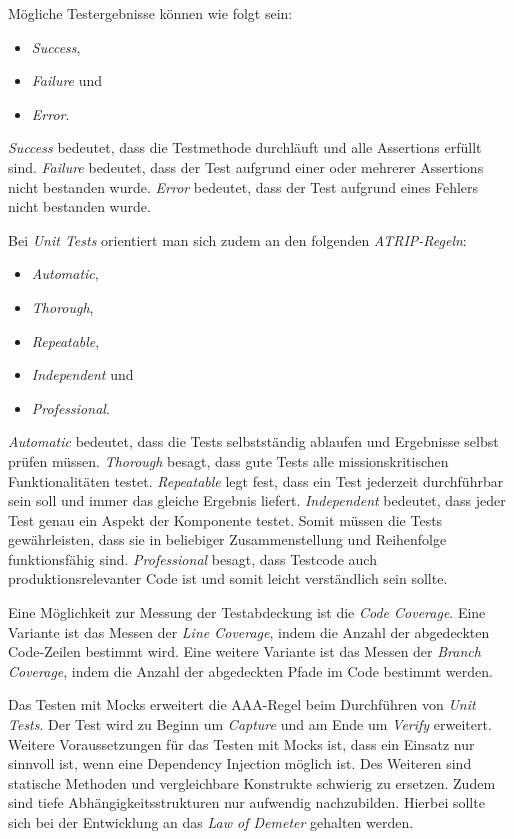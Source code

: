 Mögliche Testergebnisse können wie folgt sein:
\begin{itemize}
    \item \textit{Success},
    \item \textit{Failure} und
    \item \textit{Error}.
\end{itemize}

\textit{Success} bedeutet, dass die Testmethode durchläuft und alle Assertions erfüllt sind.
\textit{Failure} bedeutet, dass der Test aufgrund einer oder mehrerer Assertions nicht bestanden wurde.
\textit{Error} bedeutet, dass der Test aufgrund eines Fehlers nicht bestanden wurde.

Bei \textit{Unit Tests} orientiert man sich zudem an den folgenden \textit{ATRIP-Regeln}:
\begin{itemize}
    \item \textit{Automatic},
    \item \textit{Thorough},
    \item \textit{Repeatable},
    \item \textit{Independent} und
    \item \textit{Professional}.
\end{itemize}

\textit{Automatic} bedeutet, dass die Tests selbstständig ablaufen und Ergebnisse selbst prüfen müssen.
\textit{Thorough} besagt, dass gute Tests alle missionskritischen Funktionalitäten testet.
\textit{Repeatable} legt fest, dass ein Test jederzeit durchführbar sein soll und immer das gleiche Ergebnis liefert.
\textit{Independent} bedeutet, dass jeder Test genau ein Aspekt der Komponente testet.
Somit müssen die Tests gewährleisten, dass sie in beliebiger Zusammenstellung und Reihenfolge funktionsfähig sind.
\textit{Professional} besagt, dass Testcode auch produktionsrelevanter Code ist und somit leicht verständlich sein sollte.

Eine Möglichkeit zur Messung der Testabdeckung ist die \textit{Code Coverage}.
Eine Variante ist das Messen der \textit{Line Coverage}, indem die Anzahl der abgedeckten Code-Zeilen bestimmt wird.
Eine weitere Variante ist das Messen der \textit{Branch Coverage}, indem die Anzahl der abgedeckten Pfade im Code bestimmt werden.

Das Testen mit Mocks erweitert die AAA-Regel beim Durchführen von \textit{Unit Tests}.
Der Test wird zu Beginn um \textit{Capture} und am Ende um \textit{Verify} erweitert.
Weitere Voraussetzungen für das Testen mit Mocks ist, dass ein Einsatz nur sinnvoll ist, wenn eine Dependency Injection möglich ist.
Des Weiteren sind statische Methoden und vergleichbare Konstrukte schwierig zu ersetzen.
Zudem sind tiefe Abhängigkeitsstrukturen nur aufwendig nachzubilden.
Hierbei sollte sich bei der Entwicklung an das \textit{Law of Demeter} gehalten werden.

